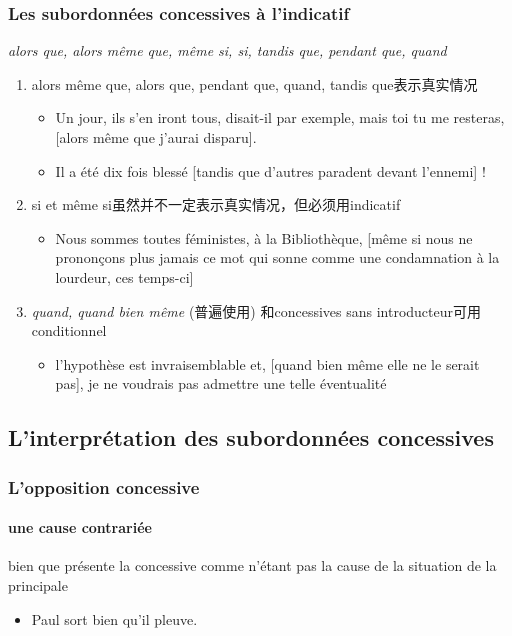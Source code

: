 \documentclass[UTF8]{report}
\begin{document}
\subsubsection{Les subordonnées concessives à l’indicatif}
\textit{alors que, alors même que, même si, si, tandis que, pendant que, quand}

\begin{enumerate}
    \item alors même que, alors que, pendant que, quand, tandis que表示真实情况
    \begin{itemize}
        \item Un jour, ils s’en iront tous, disait-il par exemple, mais toi tu me resteras, [alors même que j’aurai disparu].
        \item Il a été dix fois blessé [tandis que d’autres paradent devant l’ennemi] ! 
    \end{itemize}
    \item si et même si虽然并不一定表示真实情况，但必须用indicatif
    \begin{itemize}
        \item Nous sommes toutes féministes, à la Bibliothèque, [même si nous ne prononçons plus jamais ce mot qui sonne comme une condamnation à la lourdeur, ces temps-ci] 
    \end{itemize}
    \item \textit{quand, quand bien même} (普遍使用) 和concessives sans introducteur可用conditionnel
    \begin{itemize}
        \item l’hypothèse est invraisemblable et, [quand bien même elle ne le serait pas], je ne voudrais pas admettre
une telle éventualité
    \end{itemize}
\end{enumerate}

\subsection{L’interprétation des subordonnées concessives}

\subsubsection{L’opposition concessive}
\paragraph{une cause contrariée}
bien que présente la concessive comme n’étant pas la cause de la situation de la principale
\begin{itemize}
    \item Paul sort bien qu’il pleuve.
\end{itemize}
\end{document}
